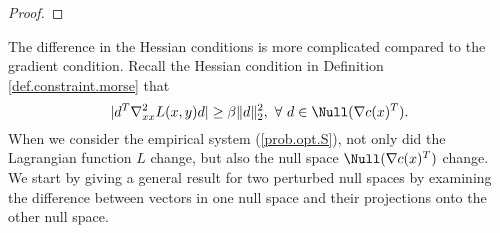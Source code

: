 \begin{proof}
\end{proof}

The difference in the Hessian conditions is more complicated compared to the gradient condition. Recall the Hessian condition in Definition \ref{def.constraint.morse} that
\[
|d^T\nabla^2_{xx}L(x,y)d|\ge\beta\|d\|_2^2,\ \forall\ d\in\Null(\nabla c(x)^T).
\]
When we consider the empirical system (\ref{prob.opt.S}), not only did the Lagrangian function $L$ change, but also the null space $\Null(\nabla c(x)^T)$ change. We start by giving a general result for two perturbed null spaces by examining the difference between vectors in one null space and their projections onto the other null space.

%

